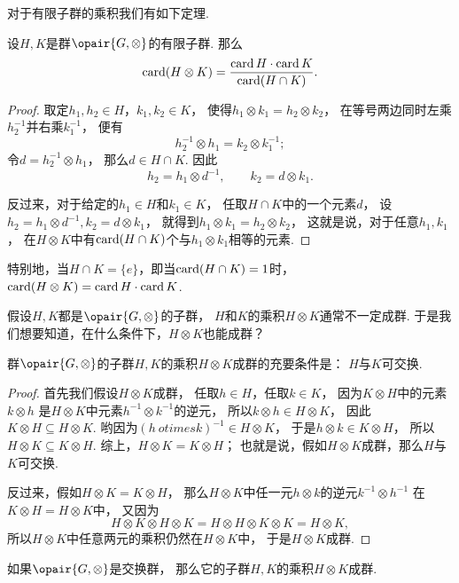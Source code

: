 对于有限子群的乘积我们有如下定理.
\begin{theorem}
设\(H,K\)是群\(\opair{G,\otimes}\)的有限子群.
那么\[
	\operatorname{card}(H \otimes K)
	= \frac{\operatorname{card} H \cdot \operatorname{card} K}{\operatorname{card}(H \cap K)}.
\]
\begin{proof}
取定\(h_1,h_2 \in H\)，\(k_1,k_2 \in K\)，
使得\(h_1 \otimes k_1 = h_2 \otimes k_2\)，
在等号两边同时左乘\(h_2^{-1}\)并右乘\(k_1^{-1}\)，
便有\[
	h_2^{-1} \otimes h_1 = k_2 \otimes k_1^{-1};
\]
令\(d = h_2^{-1} \otimes h_1\)，
那么\(d \in H \cap K\).
因此\[
	h_2 = h_1 \otimes d^{-1}, \qquad
	k_2 = d \otimes k_1.
\]

反过来，对于给定的\(h_1 \in H\)和\(k_1 \in K\)，
任取\(H \cap K\)中的一个元素\(d\)，
设\(h_2 = h_1 \otimes d^{-1},
k_2 = d \otimes k_1\)，
就得到\(h_1 \otimes k_1 = h_2 \otimes k_2\)，
这就是说，对于任意\(h_1,k_1\)，
在\(H \otimes K\)中有\(\operatorname{card}(H \cap K)\)个与\(h_1 \otimes k_1\)相等的元素.
\end{proof}
\end{theorem}

特别地，当\(H \cap K = \{e\}\)，即当\(\operatorname{card}(H \cap K) = 1\)时，
\(\operatorname{card}(H \otimes K) = \operatorname{card} H \cdot \operatorname{card} K\).

假设\(H,K\)都是\(\opair{G,\otimes}\)的子群，
\(H\)和\(K\)的乘积\(H \otimes K\)通常不一定成群.
于是我们想要知道，在什么条件下，\(H \otimes K\)也能成群？

\begin{theorem}\label{theorem:群的子集的乘积成群的充要条件}
群\(\opair{G,\otimes}\)的子群\(H,K\)的乘积\(H \otimes K\)成群的充要条件是：
\(H\)与\(K\)可交换.
\begin{proof}
首先我们假设\(H \otimes K\)成群，
任取\(h \in H\)，任取\(k \in K\)，
因为\(K \otimes H\)中的元素\(k \otimes h\)
是\(H \otimes K\)中元素\(h^{-1} \otimes k^{-1}\)的逆元，
所以\(k \otimes h \in H \otimes K\)，
因此\(K \otimes H \subseteq H \otimes K\).
哟因为\((h\ otimes k)^{-1} \in H \otimes K\)，
于是\(h \otimes k \in K \otimes H\)，
所以\(H \otimes K \subseteq K \otimes H\).
综上，\(H \otimes K = K \otimes H\)；
也就是说，假如\(H \otimes K\)成群，那么\(H\)与\(K\)可交换.

反过来，假如\(H \otimes K = K \otimes H\)，
那么\(H \otimes K\)中任一元\(h \otimes k\)的逆元\(k^{-1} \otimes h^{-1}\)
在\(K \otimes H = H \otimes K\)中，
又因为\[
	H \otimes K \otimes H \otimes K
	= H \otimes H \otimes K \otimes K
	= H \otimes K,
\]
所以\(H \otimes K\)中任意两元的乘积仍然在\(H \otimes K\)中，
于是\(H \otimes K\)成群.
\end{proof}
\end{theorem}

\begin{corollary}
如果\(\opair{G,\otimes}\)是交换群，
那么它的子群\(H,K\)的乘积\(H \otimes K\)成群.
\end{corollary}
